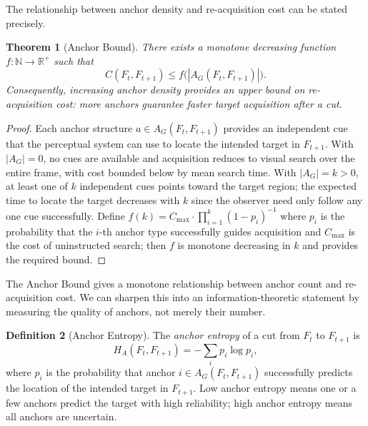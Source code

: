 \documentclass[12pt, a4paper]{article}
\theoremstyle{plain}
\newtheorem{theorem}{Theorem}[section]
\theoremstyle{definition}
\newtheorem{definition}[theorem]{Definition}
\theoremstyle{remark}
\newcommand{\AG}{A_G}
\begin{document}
The relationship between anchor density and re-acquisition
cost can be stated precisely.

\begin{theorem}[Anchor Bound]
\label{thm:anchor_bound}
  There exists a monotone decreasing function
  $f : \mathbb{N} \to \mathbb{R}^+$ such that
  \begin{equation}
    C(F_t, F_{t+1}) \leq f\bigl(|\AG(F_t, F_{t+1})|\bigr).
  \end{equation}
  Consequently, increasing anchor density provides an
  upper bound on re-acquisition cost: more anchors
  guarantee faster target acquisition after a cut.
\end{theorem}

\begin{proof}
  Each anchor structure $a \in \AG(F_t, F_{t+1})$
  provides an independent cue that the perceptual system
  can use to locate the intended target in $F_{t+1}$.
  With $|\AG| = 0$, no cues are available and acquisition
  reduces to visual search over the entire frame, with
  cost bounded below by mean search time. With
  $|\AG| = k > 0$, at least one of $k$ independent cues
  points toward the target region; the expected time to
  locate the target decreases with $k$ since the observer
  need only follow any one cue successfully. Define
  $f(k) = C_{\max} \cdot \prod_{i=1}^{k}(1 - p_i)^{-1}$
  where $p_i$ is the probability that the $i$-th anchor
  type successfully guides acquisition and $C_{\max}$ is
  the cost of uninstructed search; then $f$ is monotone
  decreasing in $k$ and provides the required bound.
\end{proof}

The Anchor Bound gives a monotone relationship between
anchor count and re-acquisition cost. We can sharpen this
into an information-theoretic statement by measuring the
quality of anchors, not merely their number.

\begin{definition}[Anchor Entropy]
\label{def:anchor_entropy}
  The \emph{anchor entropy} of a cut from $F_t$ to
  $F_{t+1}$ is
  \begin{equation}
    H_A(F_t, F_{t+1})
    = -\sum_{i} p_i \log p_i,
  \end{equation}
  where $p_i$ is the probability that anchor $i \in
  \AG(F_t, F_{t+1})$ successfully predicts the location
  of the intended target in $F_{t+1}$. Low anchor entropy
  means one or a few anchors predict the target with high
  reliability; high anchor entropy means all anchors are
  uncertain.
\end{definition}
\end{document}
